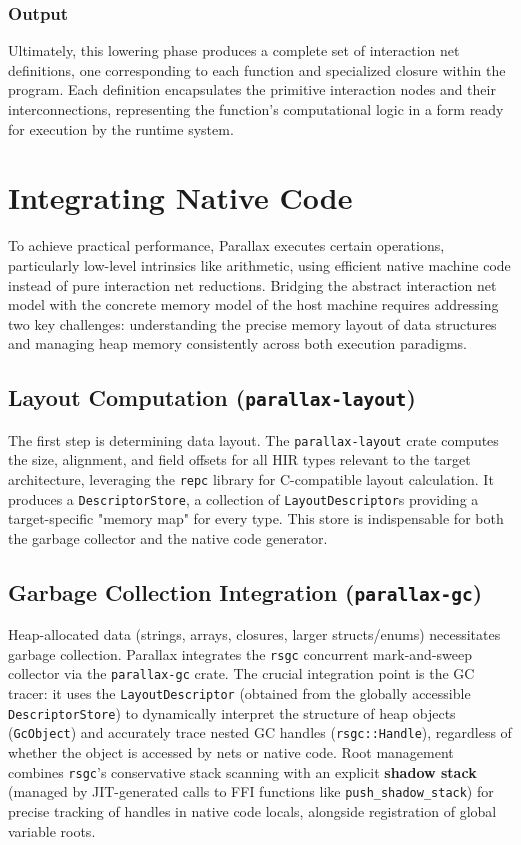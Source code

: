 \subsubsection{Output}

Ultimately, this lowering phase produces a complete set of interaction net definitions, one corresponding to each function and specialized closure within the program. Each definition encapsulates the primitive interaction nodes and their interconnections, representing the function's computational logic in a form ready for execution by the runtime system.

\section{Integrating Native Code}

To achieve practical performance, Parallax executes certain operations, particularly low-level intrinsics like arithmetic, using efficient native machine code instead of pure interaction net reductions. Bridging the abstract interaction net model with the concrete memory model of the host machine requires addressing two key challenges: understanding the precise memory layout of data structures and managing heap memory consistently across both execution paradigms.

\subsection{Layout Computation (\texttt{parallax-layout})}\label{sec:impl_layout}

The first step is determining data layout. The \texttt{parallax-layout} crate computes the size, alignment, and field offsets for all HIR types relevant to the target architecture, leveraging the \texttt{repc} library \cite{repc} for C-compatible layout calculation. It produces a \texttt{DescriptorStore}, a collection of \texttt{LayoutDescriptor}s providing a target-specific "memory map" for every type. This store is indispensable for both the garbage collector and the native code generator.

\subsection{Garbage Collection Integration (\texttt{parallax-gc})}

Heap-allocated data (strings, arrays, closures, larger structs/enums) necessitates garbage collection. Parallax integrates the \texttt{rsgc} concurrent mark-and-sweep collector \cite{rsgc} via the \texttt{parallax-gc} crate. The crucial integration point is the GC tracer: it uses the \texttt{LayoutDescriptor} (obtained from the globally accessible \texttt{DescriptorStore}) to dynamically interpret the structure of heap objects (\texttt{GcObject}) and accurately trace nested GC handles (\texttt{rsgc::Handle}), regardless of whether the object is accessed by nets or native code. Root management combines \texttt{rsgc}'s conservative stack scanning with an explicit \textbf{shadow stack} (managed by JIT-generated calls to FFI functions like \texttt{push\_shadow\_stack}) for precise tracking of handles in native code locals, alongside registration of global variable roots.

